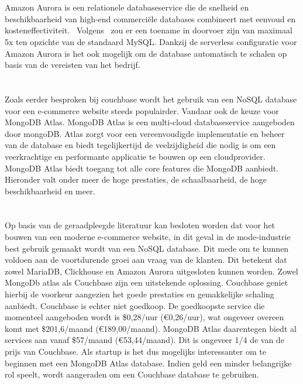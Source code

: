 \newpage

\section{}%
\label{sec:Amazon Aurora}

Amazon Aurora is een relationele databaseservice die de snelheid en beschikbaarheid van high-end commerciële databases combineert met eenvoud en kosteneffectiviteit.~\autocite{Amazonb} Volgens~\textcite{Amazonb} zou er een toename in doorvoer zijn van maximaal 5x ten opzichte van de standaard MySQL. Dankzij de serverless configuratie voor Amazon Aurora is het ook mogelijk om de database automatisch te schalen op basis van de vereisten van het bedrijf. 

\section{}%
\label{sec:MongoDB Atlas}

Zoals eerder besproken bij couchbase wordt het gebruik van een NoSQL database voor een e-commerce website steeds populairder. Vandaar ook de keuze voor MongoDB Atlas. MongoDB Atlas is een multi-cloud databaseservice aangeboden door mongoDB. Atlas zorgt voor een vereenvoudigde implementatie en beheer van de database en biedt tegelijkertijd de veelzijdigheid die nodig is om een veerkrachtige en performante applicatie te bouwen op een cloudprovider.~\autocite{MongoDBa} MongoDB Atlas biedt toegang tot alle core features die MongoDB aanbiedt. Hieronder valt onder meer de hoge prestaties, de schaalbaarheid, de hoge beschikbaarheid en meer. ~\autocite{MongoDBb}

\section{}%
\label{sec:Conclusie}

Op basis van de geraadpleegde literatuur kan besloten worden dat voor het bouwen van een moderne e-commerce website, in dit geval in de mode-industrie best gebruik gemaakt wordt van een NoSQL database. Dit mede om te kunnen voldoen aan de voortdurende groei aan vraag van de klanten. Dit betekent dat zowel MariaDB, Clickhouse en Amazon Aurora uitgesloten kunnen worden. Zowel MongoDb atlas als Couchbase zijn een uitstekende oplossing. Couchbase geniet hierbij de voorkeur aangezien het goede prestaties en gemakkelijke schaling aanbiedt. Couchbase is echter niet goedkoop. De goedkoopste service die momenteel aangeboden wordt is \$0,28/uur (€0,26/uur), wat ongeveer overeen komt met \$201,6/maand (€189,00/maand). MongoDB Atlas daarentegen biedt al services aan vanaf \$57/maand (€53,44/maand). Dit is ongeveer 1/4 de van de prijs van Couchbase. Als startup is het dus mogelijks interessanter om te beginnen met een MongoDB Atlas database. Indien geld een minder belangrijke rol speelt, wordt aangeraden om een Couchbase database te gebruiken.


